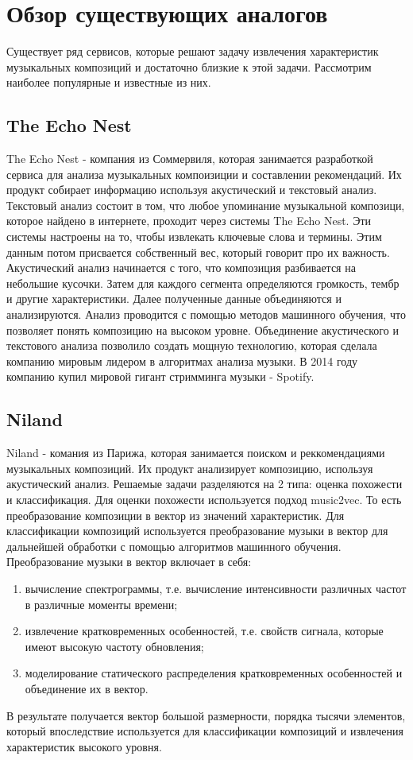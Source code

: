 \section{Обзор существующих аналогов}
\label{sec:analogues}

Существует ряд сервисов, которые решают задачу извлечения характеристик музыкальных композиций и достаточно близкие к этой задачи. Рассмотрим наиболее популярные и известные из них.

\subsection{The Echo Nest}
\label{sec:analogues:ten}
The Echo Nest - компания из Соммервиля, которая занимается разработкой сервиса для анализа музыкальных компоизиции и составлении рекомендаций. Их продукт собирает информацию используя акустический и текстовый анализ. Текстовый анализ состоит в том, что любое упоминание музыкальной композици, которое найдено в интернете, проходит через системы The Echo Nest. Эти системы настроены на то, чтобы извлекать ключевые слова и термины. Этим данным потом присвается собственный вес, который говорит про их важность. Акустический анализ начинается с того, что композиция разбивается на небольшие кусочки. Затем для каждого сегмента определяются громкость, тембр и другие характеристики. Далее полученные данные объединяются и анализируются. Анализ проводится с помощью методов машинного обучения, что позволяет понять композицию на высоком уровне. Объединение акустического и текстового анализа позволило создать мощную технологию, которая сделала компанию мировым лидером в алгоритмах анализа музыки. В 2014 году компанию купил мировой гигант стримминга музыки - Spotify.

\subsection{Niland}
\label{sec:analogues:niland}
Niland - комания из Парижа, которая занимается поиском и реккомендациями музыкальных композиций. Их продукт анализирует композицию, используя акустический анализ. Решаемые задачи разделяются на 2 типа: оценка похожести и классификация. Для оценки похожести используется подход music2vec. То есть преобразование композиции в вектор из значений характеристик. Для классификации композиций используется преобразование музыки в вектор для дальнейшей обработки с помощью алгоритмов машинного обучения. Преобразование музыки в вектор включает в себя:
\begin{enumerate}
    \item вычисление спектрограммы, т.е. вычисление интенсивности различных частот в различные моменты времени;
    \item извлечение кратковременных особенностей, т.е. свойств сигнала, которые имеют высокую частоту обновления;
    \item моделирование статического распределения кратковременных особенностей и объединение их в вектор.
\end{enumerate}
В результате получается вектор большой размерности, порядка тысячи элементов, который впоследствие используется для классификации композиций и извлечения характеристик высокого уровня.

